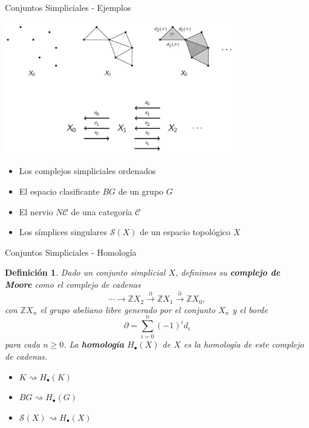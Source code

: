 \documentclass[11pt]{beamer}
\newcommand{\Z}{\mathbb{Z}}
\newtheorem{defs}{Definición}
\begin{document}
\begin{frame}{Conjuntos Simpliciales - Ejemplos}
\begin{center}
\includegraphics[width=0.75\textwidth]{SimplicialSetsIdea.jpg}
\end{center}
\begin{itemize}
\item Los complejos simpliciales ordenados
\item El espacio clasificante $BG$ de un grupo $G$
\item El nervio $N\mathscr{C}$ de una categoría $\mathscr{C}$
\item Los símplices singulares $\mathscr{S}(X)$ de un espacio topológico $X$
\end{itemize}
\end{frame}

\begin{frame}{Conjuntos Simpliciales  - Homología}
\begin{defs} Dado un conjunto simplicial $X$, definimos su \textbf{complejo de Moore} como el complejo de cadenas
\[
\cdots \to \Z X_2 \xrightarrow{\partial} \Z X_1 \xrightarrow{\partial} \Z X_0,
\]
con $\Z X_n$ el grupo abeliano libre generado por el conjunto $X_n$ y el borde
\[
\partial = \sum_{i=0}^n(-1)^i d_i
\]
para cada $n \geq 0$. La \textbf{homología} $H_\bullet(X)$ de $X$ es la homología de este complejo de cadenas.
\end{defs}
\begin{itemize}
\item $K \rightsquigarrow H_\bullet(K)$
\item $BG \rightsquigarrow H_\bullet(G)$
\item $\mathscr{S}(X) \rightsquigarrow H_\bullet(X)$
\end{itemize}
\end{frame}
\end{document}
